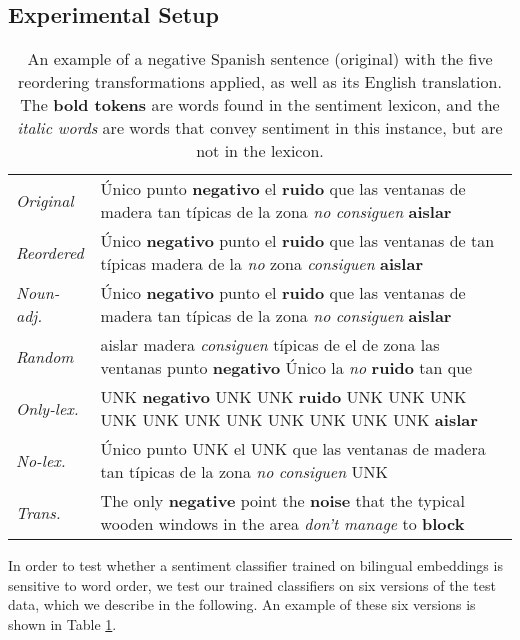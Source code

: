 \documentclass[11pt,a4paper]{article}
\begin{document}
\subsection{Experimental Setup}

\begin{table*}[]
\centering\small
\newcommand{\lex}[1]{{\setlength{\fboxsep}{1pt}\colorbox{lightred}{\textbf{#1}}}}
\newcommand{\nonlex}[1]{{\setlength{\fboxsep}{1pt}\colorbox{lighterred}{\textit{#1}}}}
\begin{tabular}{ll}
\toprule
\emph{Original} & Único punto \lex{negativo} el \lex{ruido} que las ventanas de madera tan típicas de la zona \nonlex{no} \nonlex{consiguen} \lex{aislar} \\[3pt]
\emph{Reordered} & Único \lex{negativo} punto el \lex{ruido} que las ventanas de tan típicas madera de la \nonlex{no} zona \nonlex{consiguen} \lex{aislar} \\[3pt]
\emph{Noun-adj.} & Único \lex{negativo} punto el \lex{ruido} que las ventanas de madera tan típicas de la zona \nonlex{no} \nonlex{consiguen} \lex{aislar} \\[3pt]
\emph{Random} & aislar madera \nonlex{consiguen} típicas de el de zona las ventanas punto \lex{negativo} Único la \nonlex{no} \lex{ruido} tan que\\[3pt]
\emph{Only-lex.} & UNK \lex{negativo} UNK UNK \lex{ruido} UNK UNK UNK UNK UNK UNK UNK UNK UNK UNK UNK  \lex{aislar}\\[3pt]
\emph{No-lex.} & Único punto UNK el UNK que las ventanas de madera tan típicas de la zona \nonlex{no} \nonlex{consiguen} UNK \\[3pt]
\cmidrule(lr){0-1}
\emph{Trans.} & The only \lex{negative} point the \lex{noise} that the typical wooden windows in the area \nonlex{don't manage} to \lex{block} \\[3pt]
\bottomrule
\end{tabular}
\caption{An example of a negative Spanish sentence (original) with the five reordering
transformations applied, as well as its English translation. The \lex{bold tokens} are words found in the sentiment lexicon, and the \nonlex{italic words} are words that convey sentiment in this instance, but are not in the lexicon.}
\label{example}

\end{table*}

In order to test whether a sentiment classifier trained on bilingual embeddings is sensitive to word order, we test our trained classifiers on six versions of the test
data, which we describe in the following. An example of these six versions is shown in Table \ref{example}.
\end{document}
